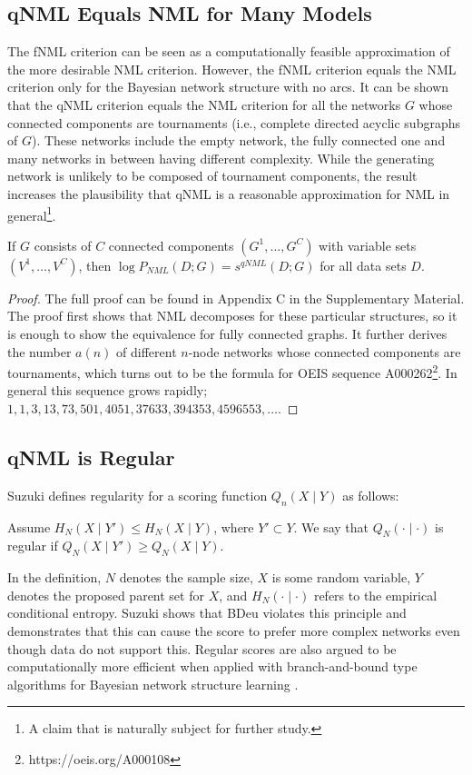 \subsection{qNML Equals NML for Many Models}
The fNML criterion can be seen as a computationally feasible
approximation of the more desirable NML criterion.  However, the fNML
criterion equals the NML criterion only for the Bayesian network
structure with no arcs.  It can be shown that the qNML criterion
equals the NML criterion for all the networks $G$ whose connected
components are tournaments (i.e., complete directed acyclic subgraphs of
$G$). These networks include the empty network, the fully connected
one and many networks in between having different complexity. While
the generating network is unlikely to be composed of tournament
components, the result increases the plausibility that qNML is a
reasonable approximation for NML in general\footnote{A claim that is
  naturally subject for further study.}.

\begin{theorem}
If $G$ consists of $C$ connected components $(G^1,\ldots,G^C)$ with
variable sets $(V^1,\ldots,V^C)$, then $\log P_{NML}(D;G) = s^{qNML}(D;G)$
for all data sets $D$.
\end{theorem}
\begin{proof}
The full proof can be found in Appendix C in the Supplementary
Material.  The proof first shows that NML decomposes for these
particular structures, so it is enough to show the equivalence for
fully connected graphs.
It further derives the number $a(n)$ of
different $n$-node networks whose connected components are
tournaments, which turns out to be the formula for OEIS sequence
A000262\footnote{https://oeis.org/A000108}.
In general this sequence grows rapidly; $1, 1, 3, 13, 73, 501, 4051,
37633, 394353, 4596553, \ldots$.
\end{proof}

\subsection{qNML is Regular}\label{sec:regularity}

Suzuki \cite{Suzuki2017} defines regularity for a scoring function $Q_n(X \mid Y)$ as follows:
\begin{definition}
Assume $H_N(X \mid Y') \leq H_N(X \mid Y)$, where $Y' \subset Y.$ We say that $Q_N(\cdot \mid \cdot)$ is regular if $Q_N(X \mid Y') \geq Q_N(X \mid Y)$.
\end{definition}
In the definition, $N$ denotes the sample size, $X$ is some random variable, $Y$ denotes the proposed parent set for $X$, and $H_N(\cdot \mid \cdot)$ refers to the empirical conditional entropy. Suzuki \cite{Suzuki2017} shows that BDeu violates this principle and demonstrates that this can cause the score to prefer more complex networks even though data do not support this. Regular scores are also argued to be computationally more efficient when applied with branch-and-bound type algorithms for Bayesian network structure learning \cite{Suzuki2017_2}. 

